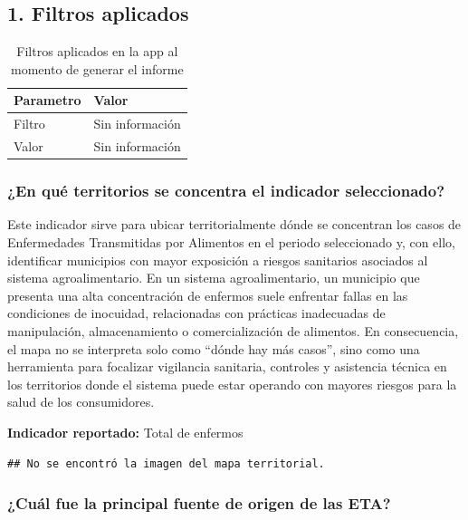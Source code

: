 \documentclass[
]{article}
\begin{document}
\subsection{1. Filtros aplicados}\label{filtros-aplicados}

\begin{table}

\caption{\label{tab:unnamed-chunk-1}Filtros aplicados en la app al momento de generar el informe}
\centering
\begin{tabular}[t]{p{}p{}}
\toprule
Parametro & Valor\\
\midrule
Filtro & Sin información\\
Valor & Sin información\\
\bottomrule
\end{tabular}
\end{table}

\subsubsection{¿En qué territorios se concentra el indicador
seleccionado?}\label{en-quuxe9-territorios-se-concentra-el-indicador-seleccionado}

Este indicador sirve para ubicar territorialmente dónde se concentran
los casos de Enfermedades Transmitidas por Alimentos en el periodo
seleccionado y, con ello, identificar municipios con mayor exposición a
riesgos sanitarios asociados al sistema agroalimentario. En un sistema
agroalimentario, un municipio que presenta una alta concentración de
enfermos suele enfrentar fallas en las condiciones de inocuidad,
relacionadas con prácticas inadecuadas de manipulación, almacenamiento o
comercialización de alimentos. En consecuencia, el mapa no se interpreta
solo como ``dónde hay más casos'', sino como una herramienta para
focalizar vigilancia sanitaria, controles y asistencia técnica en los
territorios donde el sistema puede estar operando con mayores riesgos
para la salud de los consumidores.

\textbf{Indicador reportado:} Total de enfermos

\begin{verbatim}
## No se encontró la imagen del mapa territorial.
\end{verbatim}

\subsubsection{¿Cuál fue la principal fuente de origen de las
ETA?}\label{cuuxe1l-fue-la-principal-fuente-de-origen-de-las-eta}
\end{document}
